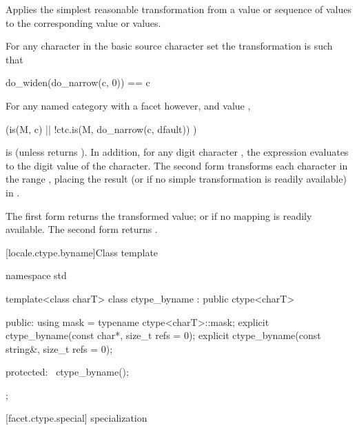 \begin{itemdescr}
\pnum
\effects
Applies the simplest reasonable transformation from a
value or sequence of
values to the corresponding
value or values.

For any character  in the basic source character set
the transformation is such that
\begin{codeblock}
do_widen(do_narrow(c, 0)) == c
\end{codeblock}

For any named
category with a
facet  however, and
value ,
\begin{codeblock}
(is(M, c) || !ctc.is(M, do_narrow(c, dfault)) )
\end{codeblock}
is
(unless
returns
).
In addition, for any digit character ,
the expression
evaluates to the digit value of the character.
The second form transforms each character
in the range
,
placing the result (or 
if no simple transformation is readily available) in
.

\pnum
\returns
The first form returns the transformed value; or 
if no mapping is readily available.
The second form returns .
\end{itemdescr}

[locale.ctype.byname]{Class template }

%
\begin{codeblock}
namespace std {
  template<class charT>
    class ctype_byname : public ctype<charT> {
    public:
      using mask = typename ctype<charT>::mask;
      explicit ctype_byname(const char*, size_t refs = 0);
      explicit ctype_byname(const string&, size_t refs = 0);

    protected:
      ~ctype_byname();
    };
}
\end{codeblock}

[facet.ctype.special]{ specialization}

